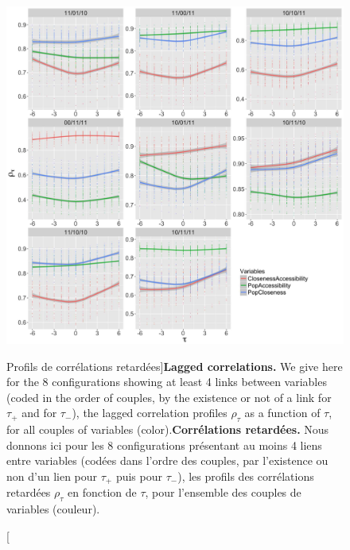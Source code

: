 \begin{figure}
	\includegraphics[width=\linewidth]{Figures/Final/6-2-2-fig-macrocoevol-correlations.jpg}
\caption[Profiles of lagged correlations][Profils de corrélations retardées]{\textbf{Lagged correlations.} We give here for the 8 configurations showing at least 4 links between variables (coded in the order of couples, by the existence or not of a link for $\tau_+$ and for $\tau_-$), the lagged correlation profiles $\rho_{\tau}$ as a function of $\tau$, for all couples of variables (color).\label{fig:macrocoevol:correlations}}{\textbf{Corrélations retardées.} Nous donnons ici pour les 8 configurations présentant au moins 4 liens entre variables (codées dans l'ordre des couples, par l'existence ou non d'un lien pour $\tau_+$ puis pour $\tau_-$), les profils des corrélations retardées $\rho_{\tau}$ en fonction de $\tau$, pour l'ensemble des couples de variables (couleur).\label{fig:macrocoevol:correlations}}
\end{figure}


